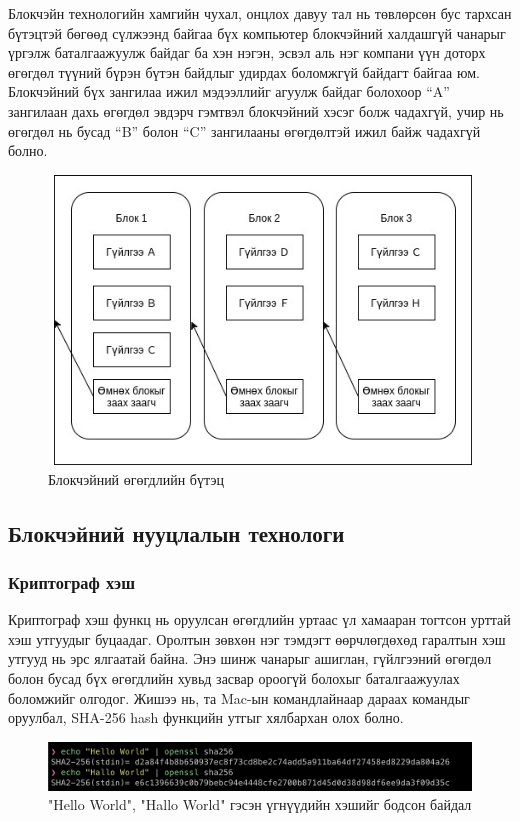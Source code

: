 Блокчэйн технологийн хамгийн чухал, онцлох давуу тал нь төвлөрсөн бус тархсан бүтэцтэй бөгөөд сүлжээнд байгаа бүх компьютер блокчэйний халдашгүй чанарыг үргэлж баталгаажуулж байдаг ба хэн нэгэн, эсвэл аль нэг компани үүн доторх өгөгдөл түүний бүрэн бүтэн байдлыг удирдах боломжгүй байдагт байгаа юм. Блокчэйний бүх зангилаа ижил мэдээллийг агуулж байдаг болохоор “A” зангилаан дахь өгөгдөл эвдэрч гэмтвэл блокчэйний хэсэг болж чадахгүй, учир нь өгөгдөл нь бусад “B” болон “C” зангилааны өгөгдөлтэй ижил байж чадахгүй болно.

\begin{figure}[h]
	\centering
	\includegraphics[scale=0.6]{src/images/blockchain-structure.jpg}
	\caption{Блокчэйний өгөгдлийн бүтэц}
\end{figure}

\subsection{Блокчэйний нууцлалын технологи}
\subsubsection{Криптограф хэш}
Криптограф хэш функц нь оруулсан өгөгдлийн уртаас үл хамааран тогтсон урттай хэш утгуудыг буцаадаг. Оролтын зөвхөн нэг тэмдэгт өөрчлөгдөхөд гаралтын хэш утгууд нь эрс ялгаатай байна. Энэ шинж чанарыг ашиглан, гүйлгээний өгөгдөл болон бусад бүх өгөгдлийн хувьд засвар ороогүй болохыг баталгаажуулах боломжийг олгодог.
Жишээ нь, та Mac-ын командлайнаар дараах командыг оруулбал, SHA-256 hash функцийн утгыг хялбархан олох болно.

\begin{figure}[h]
	\centering
	\includegraphics[scale=0.36]{src/images/hash-example.png}
	\caption{"Hello World", "Hallo World" гэсэн үгнүүдийн хэшийг бодсон байдал}
\end{figure}

